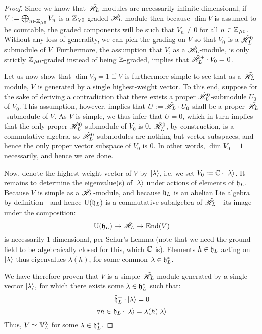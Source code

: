             \begin{proof}
                Since we know that $\tilde{\mathscr{H}}_L$-modules are necessarily infinite-dimensional, if $V := \bigoplus_{n \in \mathbb{Z}_{\geqslant 0}} V_n$ is a $\mathbb{Z}_{\geqslant 0}$-graded $\tilde{\mathscr{H}}_L$-module then because $\dim V$ is assumed to be countable, the graded components will be such that $V_n \not = 0$ for all $n \in \mathbb{Z}_{\geqslant 0}$. Without any loss of generality, we can pick the grading on $V$ so that $V_0$ is a $\tilde{\mathscr{H}}_L^0$-submodule of $V$. Furthermore, the assumption that $V$, as a $\tilde{\mathscr{H}}_L$-module, is only strictly $\mathbb{Z}_{\geqslant 0}$-graded instead of being $\mathbb{Z}$-graded, implies that $\tilde{\mathscr{H}}_L^+ \cdot V_0 = 0$.

                Let us now show that $\dim V_0 = 1$ if $V$ is furthermore simple to see that as a $\tilde{\mathscr{H}}_L$-module, $V$ is generated by a single highest-weight vector. To this end, suppose for the sake of deriving a contradiction that there exists a proper $\tilde{\mathscr{H}}_L^0$-submodule $U_0$ of $V_0$. This assumption, however, implies that $U := \tilde{\mathscr{H}}_L \cdot U_0$ shall be a proper $\tilde{\mathscr{H}}_L$-submodule of $V$. As $V$ is simple, we thus infer that $U = 0$, which in turn implies that the only proper $\tilde{\mathscr{H}}_L^0$-submodule of $V_0$ is $0$. $\tilde{\mathscr{H}}_L^0$, by construction, is a commutative algebra, so $\tilde{\mathscr{H}}_L^0$-submodules are nothing but vector subspaces, and hence the only proper vector subspace of $V_0$ is $0$. In other words, $\dim V_0 = 1$ necessarily, and hence we are done.

                Now, denote the highest-weight vector of $V$ by $\lvert {\lambda} \rangle$, i.e. we set $V_0 := \mathbb{C} \cdot \lvert {\lambda} \rangle$. It remains to determine the eigenvalue(s) of $\lvert {\lambda} \rangle$ under actions of elements of $\mathfrak{h}_L$. Because $V$ is simple as a $\tilde{\mathscr{H}}_L$-module, and because $\mathfrak{h}_L$ is an abelian Lie algebra by definition - and hence $\mathrm{U}(\mathfrak{h}_L)$ is a commutative subalgebra of $\tilde{\mathscr{H}}_L$ - its image under the composition:
                    $$\mathrm{U}(\mathfrak{h}_L) \to \tilde{\mathscr{H}}_L \to \mathrm{End}(V)$$
                is necessarily $1$-dimensional, per Schur's Lemma (note that we need the ground field to be algebraically closed for this, which $\mathbb{C}$ is). Elements $h \in \mathfrak{h}_L$ acting on $\lvert {\lambda} \rangle$ thus eigenvalues $\lambda(h)$, for some common $\lambda \in \mathfrak{h}_L^*$. 

                We have therefore proven that $V$ is a simple $\tilde{\mathscr{H}}_L$-module generated by a single vector $\lvert {\lambda} \rangle$, for which there exists some $\lambda \in \mathfrak{h}_L^*$ such that:
                    $$\tilde{\mathfrak{h}}_L^+ \cdot \lvert {\lambda} \rangle = 0$$
                    $$\forall h \in \mathfrak{h}_L \cdot \lvert {\lambda} \rangle = \lambda(h) \lvert {\lambda} \rangle$$
                Thus, $V \simeq \mathbb{V}_L^{\lambda}$ for some $\lambda \in \mathfrak{h}_L^*$.
            \end{proof}

